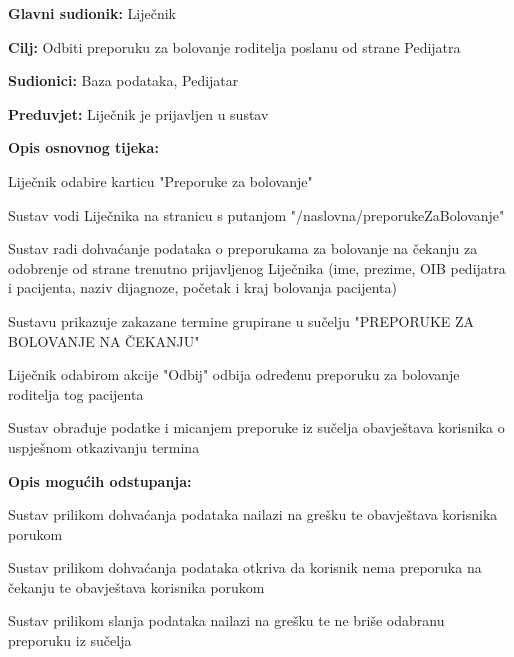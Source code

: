 					
					\noindent {}
					\begin{packed_item}
						
						\item \textbf{Glavni sudionik: }Liječnik
						\item  \textbf{Cilj:} Odbiti preporuku za bolovanje roditelja poslanu od strane Pedijatra
						\item  \textbf{Sudionici:} Baza podataka, Pedijatar
						\item  \textbf{Preduvjet:} Liječnik je prijavljen u sustav
						\item  \textbf{Opis osnovnog tijeka:}
						
						\item[] \begin{packed_enum}
							\item Liječnik odabire karticu "Preporuke za bolovanje"
							\item Sustav vodi Liječnika na stranicu s putanjom "/naslovna/preporukeZaBolovanje"
							\item Sustav radi dohvaćanje podataka o preporukama za bolovanje na čekanju za odobrenje od strane trenutno prijavljenog Liječnika (ime, prezime, OIB pedijatra i pacijenta, naziv dijagnoze, početak i kraj bolovanja pacijenta)
							\item Sustavu prikazuje zakazane termine grupirane u sučelju "PREPORUKE ZA BOLOVANJE NA ČEKANJU"
							\item Liječnik odabirom akcije "Odbij" odbija određenu preporuku za bolovanje roditelja tog pacijenta
							\item Sustav obrađuje podatke i micanjem preporuke iz sučelja obavještava korisnika o uspješnom otkazivanju termina
						\end{packed_enum}
						
						\item  \textbf{Opis mogućih odstupanja:}
						
						\item[] \begin{packed_item}
							\item[3.a] Sustav prilikom dohvaćanja podataka nailazi na grešku te obavještava korisnika porukom
							
							\item[3.b] Sustav prilikom dohvaćanja podataka otkriva da korisnik nema preporuka na čekanju te obavještava korisnika porukom
							
							\item[6.a] Sustav prilikom slanja podataka nailazi na grešku te ne briše odabranu preporuku iz sučelja
						\end{packed_item}
					\end{packed_item}	
					
